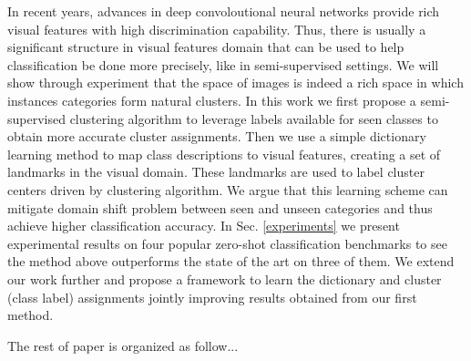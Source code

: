 \documentclass[wcp]{jmlr}
\begin{document}
 In recent years, advances in deep convoloutional neural networks provide rich visual features with high discrimination capability.
 Thus, there is usually a significant structure in visual features domain
that can be used to help classification be done more precisely, like in semi-supervised settings. We will show through experiment that
the space of images is indeed a rich space in which instances categories form natural clusters.
 In this work
 we first propose a
  semi-supervised clustering algorithm to leverage labels available for seen classes to obtain more accurate cluster assignments.
 Then we use a simple dictionary learning method to map class descriptions to visual features, creating a set of landmarks in the visual domain. These landmarks are used to label cluster centers driven by clustering algorithm. We argue that this learning scheme can mitigate domain shift problem \cite{eccv14} between seen and unseen categories and thus achieve higher classification accuracy.
In Sec. \ref{experiments} we present experimental results on four popular zero-shot classification benchmarks to see
the method above outperforms the state of the art on three of them.
 We extend our work further and propose a framework to learn the dictionary and cluster (class label) assignments jointly
 improving results obtained from our first method.

The rest of paper is organized as follow...
\end{document}
